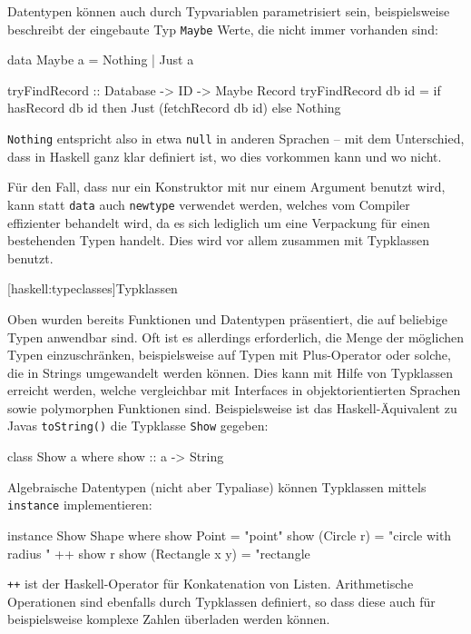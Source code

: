 \documentclass[12pt, a4paper, bibgerm]{scrbook}
\newenvironment{DIFnomarkup}{}{}
\newcommand\icode[1]{\lstinline?#1?}
\newcommand\lsection{}
\begin{document}
Datentypen können auch durch Typvariablen parametrisiert sein,
beispielsweise beschreibt der eingebaute Typ \icode{Maybe} Werte, die
nicht immer vorhanden sind:
\begin{DIFnomarkup}\begin{code}
data Maybe a = Nothing | Just a

tryFindRecord :: Database -> ID -> Maybe Record
tryFindRecord db id = if hasRecord db id
                      then
                        Just (fetchRecord db id)
                      else
                        Nothing
\end{code}\end{DIFnomarkup}
\icode{Nothing} entspricht also in etwa \icode{null} in anderen Sprachen
-- mit dem Unterschied, dass in Haskell ganz klar definiert ist, wo dies
vorkommen kann und wo nicht.

Für den Fall, dass nur ein Konstruktor mit nur einem Argument benutzt
wird, kann statt \icode{data} auch \icode{newtype} verwendet
werden, welches vom Compiler effizienter behandelt wird, da es sich
lediglich um eine Verpackung für einen bestehenden Typen handelt. Dies
wird vor allem zusammen mit Typklassen benutzt.

\lsection[haskell:typeclasses]{Typklassen}

Oben wurden bereits Funktionen und Datentypen präsentiert, die auf
beliebige Typen anwendbar sind. Oft ist es allerdings erforderlich, die
Menge der möglichen Typen einzuschränken, beispielsweise auf Typen mit
Plus-Operator oder solche, die in Strings umgewandelt werden
können. Dies kann mit Hilfe von Typklassen erreicht werden, welche
vergleichbar mit Interfaces in objektorientierten Sprachen sowie
polymorphen Funktionen sind. Beispielsweise ist das Haskell-Äquivalent
zu Javas \icode{toString()} die Typklasse \icode{Show} gegeben:
\begin{DIFnomarkup}\begin{code}
class Show a where
  show :: a -> String
\end{code}\end{DIFnomarkup}
Algebraische Datentypen (nicht aber Typaliase) können Typklassen mittels
\icode{instance} implementieren:
\begin{DIFnomarkup}\begin{code}
instance Show Shape where
  show Point           = "point"
  show (Circle r)      = "circle with radius " ++ show r
  show (Rectangle x y) = "rectangle
\end{code}\end{DIFnomarkup}
\icode{++} ist der Haskell-Operator für Konkatenation von Listen.
Arithmetische Operationen sind ebenfalls durch Typklassen definiert, so
dass diese auch für beispielsweise komplexe Zahlen überladen werden
können.
\end{document}
